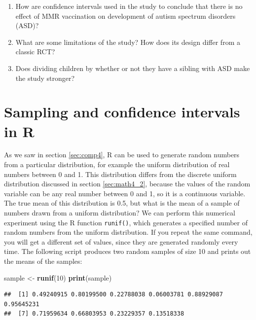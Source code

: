 \documentclass[
]{book}
\newenvironment{Shaded}{\begin{snugshade}}{\end{snugshade}}
\newcommand{\DecValTok}[1]{\textcolor[rgb]{0.00,0.00,0.81}{#1}}
\newcommand{\KeywordTok}[1]{\textcolor[rgb]{0.13,0.29,0.53}{\textbf{#1}}}
\newcommand{\NormalTok}[1]{#1}
\newcommand{\StringTok}[1]{\textcolor[rgb]{0.31,0.60,0.02}{#1}}
\theoremstyle{definition}
\theoremstyle{definition}
\theoremstyle{definition}
\theoremstyle{remark}
\begin{document}
\begin{enumerate}
\def\labelenumi{\arabic{enumi}.}
\item
  How are confidence intervals used in the study to conclude that there is no effect of MMR vaccination on development of autism spectrum disorders (ASD)?
\item
  What are some limitations of the study? How does its design differ from a classic RCT?
\item
  Does dividing children by whether or not they have a sibling with ASD make the study stronger?
\end{enumerate}

\hypertarget{sampling-and-confidence-intervals-in-r}{%
\section{Sampling and confidence intervals in R}\label{sampling-and-confidence-intervals-in-r}}

As we saw in section \ref{sec:comp4}, R can be used to generate random numbers from a particular distribution, for example the uniform distribution of real numbers between 0 and 1. This distribution differs from the discrete uniform distribution discussed in section \ref{sec:math4_2}, because the values of the random variable can be any real number between 0 and 1, so it is a continuous variable. The true mean of this distribution is 0.5, but what is the mean of a sample of numbers drawn from a uniform distribution? We can perform this numerical experiment using the R function \texttt{runif()}, which generates a specified number of random numbers from the uniform distribution. If you repeat the same command, you will get a different set of values, since they are generated randomly every time. The following script produces two random samples of size 10 and prints out the means of the samples:

\begin{Shaded}
\begin{Highlighting}[]
\NormalTok{sample \textless{}{-}}\StringTok{ }\KeywordTok{runif}\NormalTok{(}\DecValTok{10}\NormalTok{)}
\KeywordTok{print}\NormalTok{(sample)}
\end{Highlighting}
\end{Shaded}

\begin{verbatim}
##  [1] 0.49240915 0.80199500 0.22788038 0.06003781 0.88929087 0.95645231
##  [7] 0.71959634 0.66803953 0.23229357 0.13518338
\end{verbatim}
\end{document}
